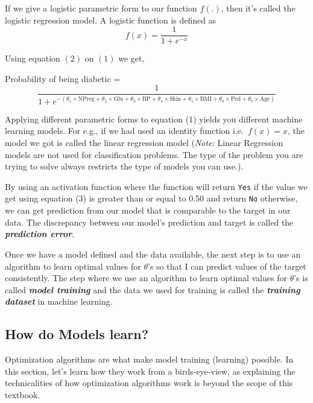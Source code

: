 \documentclass[
  letterpaper,
]{book}
\begin{document}
If we give a logistic parametric form to our function \(f(.)\), then
it's called the logistic regression model. A logistic function is
defined as \[f(x) = \frac{1}{1 + e^{-x}} \tag{2}\]

Using equation \((2)\) on \((1)\) we get,

Probability of being diabetic =
\[\frac{1}{1 + e^{- (\theta_1 \times \text{NPreg} +
\theta_2 \times \text{Glu} +
\theta_3 \times \text{BP} +
\theta_4 \times \text{Skin} +
\theta_5 \times \text{BMI} +
\theta_6 \times \text{Ped} +
\theta_7 \times \text{Age})}} \tag{3}\]

Applying different parametric forms to equation (1) yields you different
machine learning models. For e.g., if we had used an identity function
i.e.~\(f(x) = x\), the model we got is called the linear regression
model (\emph{Note:} Linear Regression models are not used for
classification problems. The type of the problem you are trying to solve
always restricts the type of models you can use.).

By using an activation function where the function will return
\texttt{Yes} if the value we get using equation (3) is greater than or
equal to 0.50 and return \texttt{No} otherwise, we can get prediction
from our model that is comparable to the target in our data. The
discrepancy between our model's prediction and target is called the
\textbf{\emph{prediction error}}.

Once we have a model defined and the data available, the next step is to
use an algorithm to learn optimal values for \(\theta\)'s so that I can
predict values of the target consistently. The step where we use an
algorithm to learn optimal values for \(\theta\)'s is called
\textbf{\emph{model training}} and the data we used for training is
called the \textbf{\emph{training dataset}} in machine learning.

\hypertarget{sec-optimization}{%
\subsection{How do Models learn?}\label{sec-optimization}}

Optimization algorithms are what make model training (learning)
possible. In this section, let's learn how they work from a
birds-eye-view, as explaining the technicalities of how optimization
algorithms work is beyond the scope of this textbook.
\end{document}
